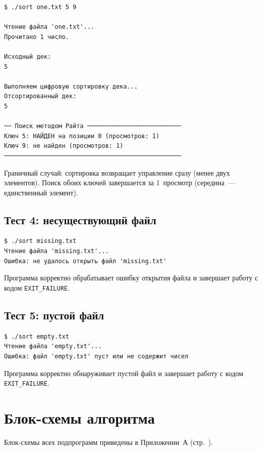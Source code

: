 \documentclass[a4paper,14pt]{extarticle}
\begin{document}
\begin{Verbatim}[frame=single,fontsize=\footnotesize]
$ ./sort one.txt 5 9

Чтение файла 'one.txt'...
Прочитано 1 число.

Исходный дек:
5

Выполняем цифровую сортировку дека...
Отсортированный дек:
5

── Поиск методом Райта ──────────────────────────
Ключ 5: НАЙДЕН на позиции 0 (просмотров: 1)
Ключ 9: не найден (просмотров: 1)
─────────────────────────────────────────────────
\end{Verbatim}

Граничный случай: сортировка возвращает управление сразу (менее двух элементов). Поиск обоих ключей завершается за 1~просмотр (середина~--- единственный элемент).

\subsection{Тест 4: несуществующий файл}

\begin{Verbatim}[frame=single,fontsize=\footnotesize]
$ ./sort missing.txt
Чтение файла 'missing.txt'...
Ошибка: не удалось открыть файл 'missing.txt'
\end{Verbatim}

Программа корректно обрабатывает ошибку открытия файла и завершает работу с кодом \texttt{EXIT\_FAILURE}.

\subsection{Тест 5: пустой файл}

\begin{Verbatim}[frame=single,fontsize=\footnotesize]
$ ./sort empty.txt
Чтение файла 'empty.txt'...
Ошибка: файл 'empty.txt' пуст или не содержит чисел
\end{Verbatim}

Программа корректно обнаруживает пустой файл и завершает работу с кодом \texttt{EXIT\_FAILURE}.

\newpage
\section{Блок-схемы алгоритма}

Блок-схемы всех подпрограмм приведены в Приложении~А (стр.~\pageref{sec:appendix}).
\end{document}
